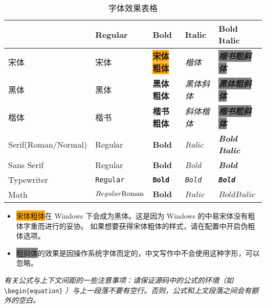 \begin{table}[htb]
    \centering
    \caption{字体效果表格}
    \begin{tabular}{@{}lllll@{}}
    \toprule
               & Regular & Bold & Italic & Bold Italic \\ \midrule
      宋体       & 宋体      & \colorbox{orange}{\textbf{宋体粗体}} & \textit{楷体}     &   \colorbox{gray}{\textbf{\textit{楷书粗斜体}}}  \\
      黑体         & {\heiti{}黑体}      & \textbf{\heiti{}黑体粗体} &   \textit{\heiti{}黑体斜体}     & \colorbox{gray}{\textit{\textbf{\heiti{}黑体粗斜体}}}   \\
      楷体         & {\kaishu{}楷书}      & \textbf{\kaishu{}楷书粗体} & \textit{\kaishu{}斜体楷体} &  \colorbox{gray}{\textbf{\textit{\kaishu{}楷书粗斜体}}}    \\
    Serif(Roman/Normal)      &    Regular    &  \textbf{Bold}  &    \textit{Italic}    &     \textbf{\textit{Bold Italic}}    \\
    Sans Serif &  \textsf{Regular}       &  \textbf{\textsf{Bold}}    &  \textit{\textsf{Bold}}   &    \textbf{\textit{\textsf{Bold}}}   \\
    Typewriter &  \texttt{Regular}       &  \textbf{\texttt{Bold}}    &  \textit{\texttt{Bold}}   &    \textbf{\textit{\texttt{Bold}}}   \\
    Math       &   $\mathnormal{Regular} \mathrm{Roman}$  & $\mathbf{Bold}$   &    $\mathit{Italic}$    &  $\mathbf{\mathit{Bold Italic}}$    \\ \bottomrule
    \end{tabular}
\end{table}

\begin{itemize}[nosep]
  \item \colorbox{orange}{宋体粗体}在 Windows 下会成为黑体。这是因为 Windows 的中易宋体没有粗体字重而进行的妥协。
    如果想要获得宋体粗体的样式，请在配置中开启伪粗体选项。
  \item \colorbox{gray}{粗斜体}的效果是因操作系统字体而定的，中文写作中不会使用这种字形，可以忽略。
\end{itemize}

\textit{有关公式与上下文间距的一些注意事项：请保证源码中的公式的环境（如}
\\ \verb|\begin{equation}|
  \textit{）与上一段落不要有空行。否则，公式和上文段落之间会有额外的空白。}

